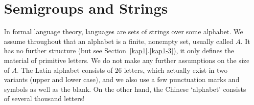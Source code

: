 \section{Semigroups and Strings}
\label{einseins}
\label{kap1-2}
%
%
%
In formal language theory, languages are sets of strings over some
alphabet. We assume throughout that an alphabet is a finite,
nonempty set, usually called $A$. It has no further structure (but
see Section~\ref{kap1}.\ref{kap1-3}), it only defines the material of
primitive letters. We do not make any further assumptions on the
size of $A$. The Latin alphabet consists of 26 letters, which
actually exist in two variants (upper and lower case), and we also
use a few punctuation marks and symbols as well as the blank. On
the other hand, the Chinese `alphabet' consists of several
thousand letters!

